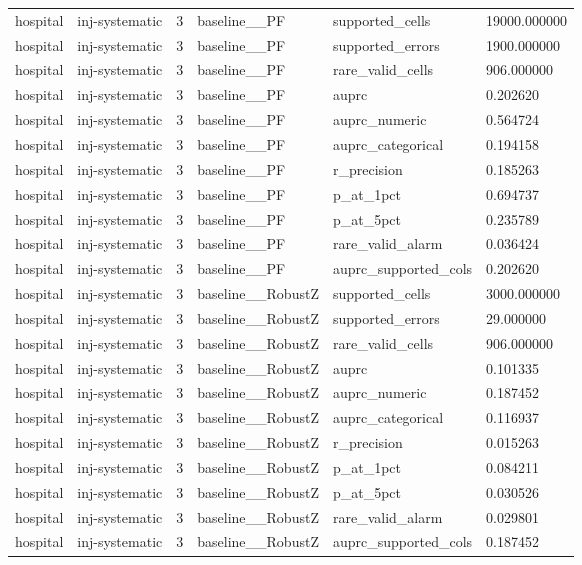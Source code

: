 \begin{tabular}{llllll}
hospital & inj-systematic & 3 & baseline\_\_PF & supported\_cells & 19000.000000 \\
hospital & inj-systematic & 3 & baseline\_\_PF & supported\_errors & 1900.000000 \\
hospital & inj-systematic & 3 & baseline\_\_PF & rare\_valid\_cells & 906.000000 \\
hospital & inj-systematic & 3 & baseline\_\_PF & auprc & 0.202620 \\
hospital & inj-systematic & 3 & baseline\_\_PF & auprc\_numeric & 0.564724 \\
hospital & inj-systematic & 3 & baseline\_\_PF & auprc\_categorical & 0.194158 \\
hospital & inj-systematic & 3 & baseline\_\_PF & r\_precision & 0.185263 \\
hospital & inj-systematic & 3 & baseline\_\_PF & p\_at\_1pct & 0.694737 \\
hospital & inj-systematic & 3 & baseline\_\_PF & p\_at\_5pct & 0.235789 \\
hospital & inj-systematic & 3 & baseline\_\_PF & rare\_valid\_alarm & 0.036424 \\
hospital & inj-systematic & 3 & baseline\_\_PF & auprc\_supported\_cols & 0.202620 \\
hospital & inj-systematic & 3 & baseline\_\_RobustZ & supported\_cells & 3000.000000 \\
hospital & inj-systematic & 3 & baseline\_\_RobustZ & supported\_errors & 29.000000 \\
hospital & inj-systematic & 3 & baseline\_\_RobustZ & rare\_valid\_cells & 906.000000 \\
hospital & inj-systematic & 3 & baseline\_\_RobustZ & auprc & 0.101335 \\
hospital & inj-systematic & 3 & baseline\_\_RobustZ & auprc\_numeric & 0.187452 \\
hospital & inj-systematic & 3 & baseline\_\_RobustZ & auprc\_categorical & 0.116937 \\
hospital & inj-systematic & 3 & baseline\_\_RobustZ & r\_precision & 0.015263 \\
hospital & inj-systematic & 3 & baseline\_\_RobustZ & p\_at\_1pct & 0.084211 \\
hospital & inj-systematic & 3 & baseline\_\_RobustZ & p\_at\_5pct & 0.030526 \\
hospital & inj-systematic & 3 & baseline\_\_RobustZ & rare\_valid\_alarm & 0.029801 \\
hospital & inj-systematic & 3 & baseline\_\_RobustZ & auprc\_supported\_cols & 0.187452 \\

\end{tabular}
